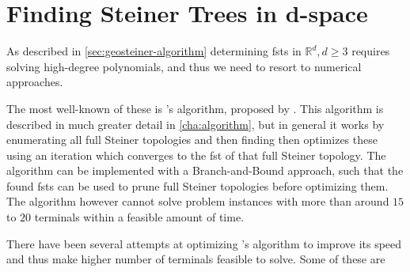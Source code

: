 \section{Finding Steiner Trees in d-space}
\label{sec:find-stein-trees-d}

As described in \cref{sec:geosteiner-algorithm} determining \acp{fst} in
$\mathbb{R}^d, d \ge 3$ requires solving high-degree polynomials, and thus we
need to resort to numerical approaches.

The most well-known of these is \citeauthor{smith1992}'s algorithm, proposed by
\textcite{smith1992}. This algorithm is described in much greater detail in
\cref{cha:algorithm}, but in general it works by enumerating all full Steiner
topologies and then finding then optimizes these using an iteration which
converges to the \ac{fst} of that full Steiner topology. The algorithm can be
implemented with a Branch-and-Bound approach, such that the found \acp{fst} can
be used to prune full Steiner topologies before optimizing them. The algorithm
however cannot solve problem instances with more than around $15$ to $20$
terminals within a feasible amount of time.

There have been several attempts at optimizing \citeauthor{smith1992}'s
algorithm to improve its speed and thus make higher number of terminals feasible
to solve. Some of these are

